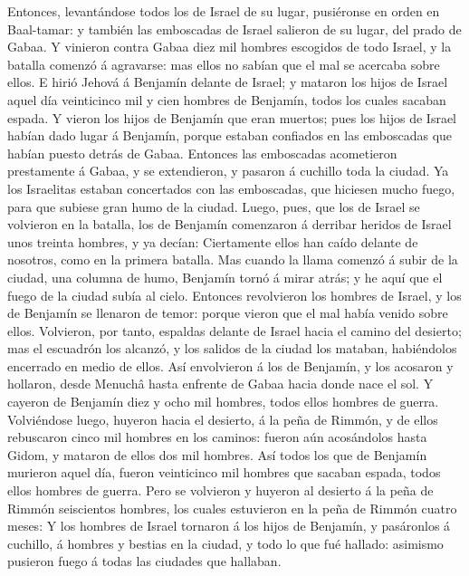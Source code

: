  Entonces, levantándose todos los de Israel de su lugar,
pusiéronse en orden en Baal-tamar: y también las emboscadas de Israel
salieron de su lugar, del prado de Gabaa.  Y vinieron
contra Gabaa diez mil hombres escogidos de todo Israel, y la batalla
comenzó á agravarse: mas ellos no sabían que el mal se acercaba sobre
ellos.  E hirió Jehová á Benjamín delante de Israel; y
mataron los hijos de Israel aquel día veinticinco mil y cien hombres de
Benjamín, todos los cuales sacaban espada.  Y vieron los
hijos de Benjamín que eran muertos; pues los hijos de Israel habían dado
lugar á Benjamín, porque estaban confiados en las emboscadas que habían
puesto detrás de Gabaa.  Entonces las emboscadas
acometieron prestamente á Gabaa, y se extendieron, y pasaron á cuchillo
toda la ciudad.  Ya los Israelitas estaban concertados con
las emboscadas, que hiciesen mucho fuego, para que subiese gran humo de
la ciudad.  Luego, pues, que los de Israel se volvieron en
la batalla, los de Benjamín comenzaron á derribar heridos de Israel unos
treinta hombres, y ya decían: Ciertamente ellos han caído delante de
nosotros, como en la primera batalla.  Mas cuando la llama
comenzó á subir de la ciudad, una columna de humo, Benjamín tornó á
mirar atrás; y he aquí que el fuego de la ciudad subía al cielo.
 Entonces revolvieron los hombres de Israel, y los de
Benjamín se llenaron de temor: porque vieron que el mal había venido
sobre ellos.  Volvieron, por tanto, espaldas delante de
Israel hacia el camino del desierto; mas el escuadrón los alcanzó, y los
salidos de la ciudad los mataban, habiéndolos encerrado en medio de
ellos.  Así envolvieron á los de Benjamín, y los acosaron y
hollaron, desde Menuchâ hasta enfrente de Gabaa hacia donde nace el sol.
 Y cayeron de Benjamín diez y ocho mil hombres, todos ellos
hombres de guerra.  Volviéndose luego, huyeron hacia el
desierto, á la peña de Rimmón, y de ellos rebuscaron cinco mil hombres
en los caminos: fueron aún acosándolos hasta Gidom, y mataron de ellos
dos mil hombres.  Así todos los que de Benjamín murieron
aquel día, fueron veinticinco mil hombres que sacaban espada, todos
ellos hombres de guerra.  Pero se volvieron y huyeron al
desierto á la peña de Rimmón seiscientos hombres, los cuales estuvieron
en la peña de Rimmón cuatro meses:  Y los hombres de Israel
tornaron á los hijos de Benjamín, y pasáronlos á cuchillo, á hombres y
bestias en la ciudad, y todo lo que fué hallado: asimismo pusieron fuego
á todas las ciudades que hallaban.

